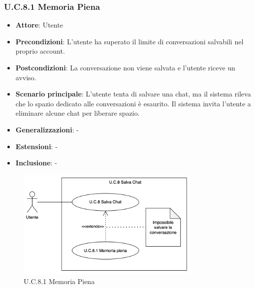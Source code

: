\subsubsection{U.C.8.1 Memoria Piena}
\begin{itemize}
    \item \textbf{Attore}: Utente
    \item \textbf{Precondizioni}: L'utente ha superato il limite di conversazioni salvabili nel proprio account.
    \item \textbf{Postcondizioni}: La conversazione non viene salvata e l'utente riceve un avviso.
    \item \textbf{Scenario principale}: L'utente tenta di salvare una chat, ma il sistema rileva che lo spazio dedicato alle conversazioni è esaurito. Il sistema invita l'utente a eliminare alcune chat per liberare spazio.
    \item \textbf{Generalizzazioni}: -
    \item \textbf{Estensioni}: -
    \item \textbf{Inclusione}: -
\end{itemize}
\begin{figure}[H]
    \centering
    \includegraphics[width=0.8\textwidth]{img/UC8.1.png}
    \caption{U.C.8.1 Memoria Piena}
\end{figure}
\newpage

